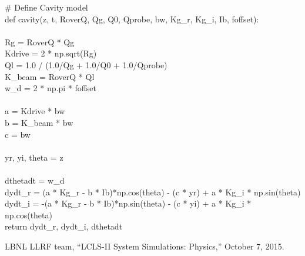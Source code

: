 \documentclass[a4paper,12pt]{article}
\begin{document}
{\selectfont\small
\# Define Cavity model
\\def cavity(z, t, RoverQ, Qg, Q0, Qprobe, bw, Kg\_r, Kg\_i, Ib,
          foffset):
\\
\\        Rg = RoverQ * Qg
\\        Kdrive = 2 * np.sqrt(Rg)
\\        Ql = 1.0 / (1.0/Qg + 1.0/Q0 + 1.0/Qprobe)
\\        K\_beam = RoverQ * Ql
\\        w\_d = 2 * np.pi * foffset
\\
\\        a = Kdrive * bw
\\        b = K\_beam * bw
\\        c = bw
\\
\\        yr, yi, theta = z
\\
\\        dthetadt = w\_d
\\        dydt\_r = (a * Kg\_r - b * Ib)*np.cos(theta) - (c * yr) + a * Kg\_i * np.sin(theta)
\\        dydt\_i = -(a * Kg\_r - b * Ib)*np.sin(theta) - (c * yi) + a * Kg\_i * np.cos(theta)
\\        return dydt\_r, dydt\_i, dthetadt
}

\newpage
\begin{thebibliography}{19}   %
LBNL LLRF team, ``LCLS-II System Simulations: Physics,''
October 7, 2015.
\end{thebibliography}
\end{document}

